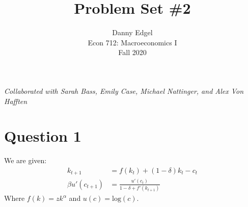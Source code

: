 \documentclass{article}
\begin{document}
\title{	Problem Set \#2 }
\author{ 	Danny Edgel 					\\ 
			Econ 712: Macroeconomics I		\\
			Fall 2020						\\
		}
\maketitle\thispagestyle{empty}


\textit{Collaborated with Sarah Bass, Emily Case, Michael Nattinger, and Alex Von Hafften}



\section*{Question 1}
We are given:
\begin{align*}
	k_{t+1} &= f(k_t)+(1-\delta)k_t-c_t		\\
	\beta u'(c_{t+1}) &= \frac{u'(c_t)}{1-\delta+f'(k_{t+1})}
\end{align*}
Where $f(k)=zk^\alpha$ and $u(c)=\text{log}(c)$.
\end{document}
